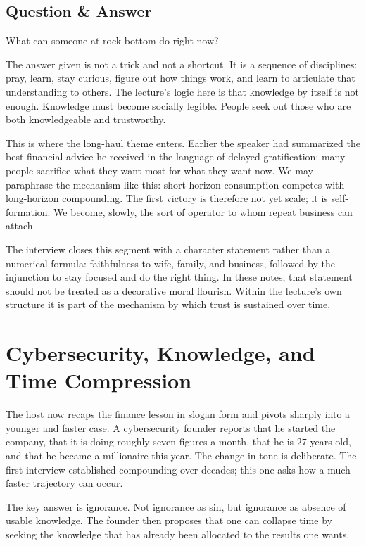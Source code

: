 \subsection{Question \& Answer}

What can someone at rock bottom do right now?

The answer given is not a trick and not a shortcut. It is a sequence of disciplines: pray, learn, stay curious, figure out how things work, and learn to articulate that understanding to others. The lecture's logic here is that knowledge by itself is not enough. Knowledge must become socially legible. People seek out those who are both knowledgeable and trustworthy.

This is where the long-haul theme enters. Earlier the speaker had summarized the best financial advice he received in the language of delayed gratification: many people sacrifice what they want most for what they want now. We may paraphrase the mechanism like this: short-horizon consumption competes with long-horizon compounding. The first victory is therefore not yet scale; it is self-formation. We become, slowly, the sort of operator to whom repeat business can attach.

The interview closes this segment with a character statement rather than a numerical formula: faithfulness to wife, family, and business, followed by the injunction to stay focused and do the right thing. In these notes, that statement should not be treated as a decorative moral flourish. Within the lecture's own structure it is part of the mechanism by which trust is sustained over time.

\section{Cybersecurity, Knowledge, and Time Compression}

The host now recaps the finance lesson in slogan form and pivots sharply into a younger and faster case. A cybersecurity founder reports that he started the company, that it is doing roughly seven figures a month, that he is \(27\) years old, and that he became a millionaire this year. The change in tone is deliberate. The first interview established compounding over decades; this one asks how a much faster trajectory can occur.

The key answer is ignorance. Not ignorance as sin, but ignorance as absence of usable knowledge. The founder then proposes that one can collapse time by seeking the knowledge that has already been allocated to the results one wants.

